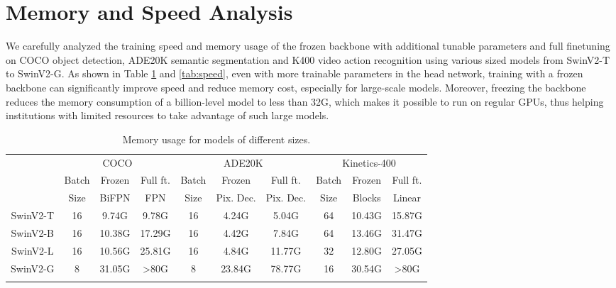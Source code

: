 \documentclass{article}
\begin{document}
\newpage





\newpage
\appendix

\section{Memory and Speed Analysis}
We carefully analyzed the training speed and memory usage of the frozen backbone with additional tunable parameters and full finetuning on COCO object detection, ADE20K semantic segmentation and K400 video action recognition using various sized models from SwinV2-T to SwinV2-G. As shown in Table \ref{tab:memory} and \ref{tab:speed}, even with more trainable parameters in the head network, training with a frozen backbone can significantly improve speed and reduce memory cost, especially for large-scale models. Moreover, freezing the backbone reduces the memory consumption of a billion-level model to less than 32G, which makes it possible to run on regular GPUs, thus helping institutions with limited resources to take advantage of such large models.
\begin{table}[htb]
        \centering
        \small
        \addtolength{\tabcolsep}{-2.5pt}
        \begin{tabular}{c|ccc|ccc|ccc}
            \Xhline{1.0pt}
            \multirow{3}{*}{Base Network} & \multicolumn{3}{c|}{COCO} & \multicolumn{3}{c|}{ADE20K} & \multicolumn{3}{c}{Kinetics-400}\\
            & Batch & Frozen & Full ft. & Batch & Frozen & Full ft. & Batch & Frozen & Full ft. \\
            & Size &  BiFPN & FPN & Size &  Pix. Dec. &  Pix. Dec. & Size &   Blocks & Linear \\
            \hline
            SwinV2-T & 16 & 9.74G & 9.78G & 16 & 4.24G & 5.04G & 64 & 10.43G & 15.87G \\
            SwinV2-B & 16 & 10.38G & 17.29G & 16 & 4.42G & 7.84G & 64 & 13.46G & 31.47G \\
            SwinV2-L & 16 & 10.56G & 25.81G & 16 & 4.84G & 11.77G & 32 & 12.80G & 27.05G \\
            SwinV2-G & 8 & 31.05G & >80G & 8 & 23.84G & 78.77G & 16 & 30.54G & >80G \\
          \Xhline{1.0pt}  
       \end{tabular}
     \caption{Memory usage for models of different sizes.}
     \label{tab:memory}
\end{table}
\end{document}
